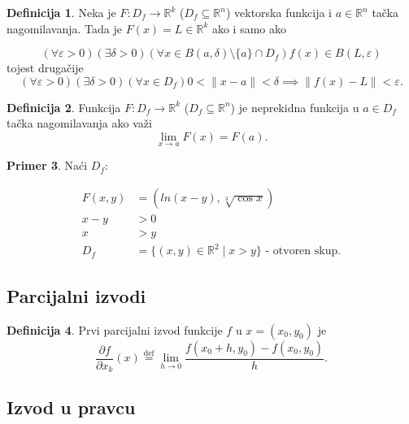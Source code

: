 \documentclass[11pt]{article}
\theoremstyle{definition}
\newtheorem{definicija}{Definicija}[section]
\newtheorem{primer}[definicija]{Primer}
\theoremstyle{serbnodot}
\begin{document}
\begin{definicija}
    Neka je \(F: D_f \to \mathbb{R}^k\) (\(D_f \subseteq \mathbb{R}^n\))
    vektorska funkcija i \(a \in \mathbb{R}^n\) tačka nagomilavanja. Tada
    je \(F(x) = L \in \mathbb{R}^k\) ako i samo ako

    \[
        (\forall \varepsilon > 0) (\exists \delta > 0) 
        (\forall x \in B(a, \delta) \setminus \{a\} \cap D_f) 
        f(x) \in B(L, \varepsilon)
    \]
    tojest drugačije
    \[
        (\forall \varepsilon > 0) (\exists \delta > 0)
        (\forall x \in D_f) 0 < \lVert x - a \rVert < \delta
        \implies \lVert f(x) - L \rVert < \varepsilon.
    \]
\end{definicija}

\begin{definicija}
    
    Funkcija \(F: D_f \to \mathbb{R}^k\) (\(D_f \subseteq \mathbb{R}^n\))
    je neprekidna funkcija u \(a \in D_f \) tačka nagomilavanja ako važi
    \[
        \lim_{x \to a}F(x) = F(a).
    \]
\end{definicija}

\begin{primer}
    Naći \(D_f\):

    \begin{align*}
        F(x, y) &= (ln(x-y), \sqrt[3]{\cos x}) \\
        x - y &> 0 \\
        x &> y \\
        D_f &= \{(x,y) \in \mathbb{R}^2 \mid x > y \} \text{ - otvoren skup.}
    \end{align*}
\end{primer}


\subsection{Parcijalni izvodi}

\begin{definicija}
    Prvi parcijalni izvod funkcije \(f\) u \(x = (x_0, y_0)\) je
    \[
        \frac{\partial f}{\partial x_k} (x) \overset{\text{def}}{=}
        \lim_{h \to 0} \frac{f(x_0 + h, y_0) - f(x_0, y_0)}{h}. 
    \]
\end{definicija}


\subsection{Izvod u pravcu}
\end{document}
